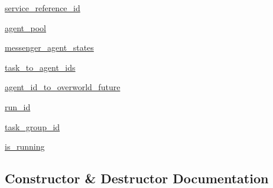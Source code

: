 \begin{DoxyCompactItemize}
\hyperlink{classparlai_1_1chat__service_1_1core_1_1chat__service__manager_1_1ChatServiceManager_a478ea28f63025fc186390230b3bbc65a}{service\+\_\+reference\+\_\+id}
\item 
\hyperlink{classparlai_1_1chat__service_1_1core_1_1chat__service__manager_1_1ChatServiceManager_ab982b846a998e063c07a0edc5f8d34ef}{agent\+\_\+pool}
\item 
\hyperlink{classparlai_1_1chat__service_1_1core_1_1chat__service__manager_1_1ChatServiceManager_a1bf9066fb32ee5d49882b87f38ef1e65}{messenger\+\_\+agent\+\_\+states}
\item 
\hyperlink{classparlai_1_1chat__service_1_1core_1_1chat__service__manager_1_1ChatServiceManager_a88fb563c2ecbcc29ec35efc35243ec74}{task\+\_\+to\+\_\+agent\+\_\+ids}
\item 
\hyperlink{classparlai_1_1chat__service_1_1core_1_1chat__service__manager_1_1ChatServiceManager_a95cfe72f24052f0a7255704beb482696}{agent\+\_\+id\+\_\+to\+\_\+overworld\+\_\+future}
\item 
\hyperlink{classparlai_1_1chat__service_1_1core_1_1chat__service__manager_1_1ChatServiceManager_aa4f6b3b4880c31e8fd260a82037a6c6e}{run\+\_\+id}
\item 
\hyperlink{classparlai_1_1chat__service_1_1core_1_1chat__service__manager_1_1ChatServiceManager_a80987a1dfe80102af73854d8b4d7a692}{task\+\_\+group\+\_\+id}
\item 
\hyperlink{classparlai_1_1chat__service_1_1core_1_1chat__service__manager_1_1ChatServiceManager_ad154fa2182cccec455c370ad623dbc1b}{is\+\_\+running}
\end{DoxyCompactItemize}


\subsection{Constructor \& Destructor Documentation}
\mbox{\label{classparlai_1_1chat__service_1_1core_1_1chat__service__manager_1_1ChatServiceManager_ac3c5275395694d74b18ff6d6f5e61f9d}} 
